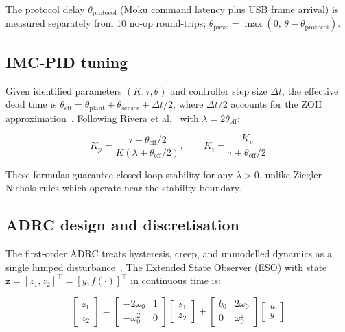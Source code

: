 \documentclass[fleqn,10pt]{wlscirep}
\begin{document}
The protocol delay $\theta_\text{protocol}$ (Moku command latency plus USB frame arrival) is measured separately from 10 no-op round-trips; $\theta_\text{piezo} = \max(0,\,\theta - \theta_\text{protocol})$.

\subsection*{IMC-PID tuning}

Given identified parameters $(K,\tau,\theta)$ and controller step size $\Delta t$, the effective dead time is $\theta_\text{eff} = \theta_\text{plant} + \theta_\text{sensor} + \Delta t / 2$, where $\Delta t/2$ accounts for the ZOH approximation~\cite{astrom1995pid}. Following Rivera et al.~\cite{rivera1986imc} with $\lambda = 2\theta_\text{eff}$:

\begin{equation}
K_p = \frac{\tau + \theta_\text{eff}/2}{K(\lambda + \theta_\text{eff}/2)}, \qquad K_i = \frac{K_p}{\tau + \theta_\text{eff}/2}
\label{eq:imc}
\end{equation}

These formulas guarantee closed-loop stability for any $\lambda > 0$, unlike Ziegler-Nichols rules which operate near the stability boundary.

\subsection*{ADRC design and discretisation}

The first-order ADRC treats hysteresis, creep, and unmodelled dynamics as a single lumped disturbance~\cite{han2009adrc,gao2003adrc}. The Extended State Observer (ESO) with state $\mathbf{z} = [z_1,z_2]^\top = [y, f(\cdot)]^\top$ in continuous time is:

\begin{equation}
\begin{bmatrix}\dot{z}_1 \\ \dot{z}_2\end{bmatrix}
= \begin{bmatrix}-2\omega_0 & 1 \\ -\omega_0^2 & 0\end{bmatrix}
\begin{bmatrix}z_1 \\ z_2\end{bmatrix}
+ \begin{bmatrix}b_0 & 2\omega_0 \\ 0 & \omega_0^2\end{bmatrix}
\begin{bmatrix}u \\ y\end{bmatrix}
\label{eq:eso}
\end{equation}
\end{document}
